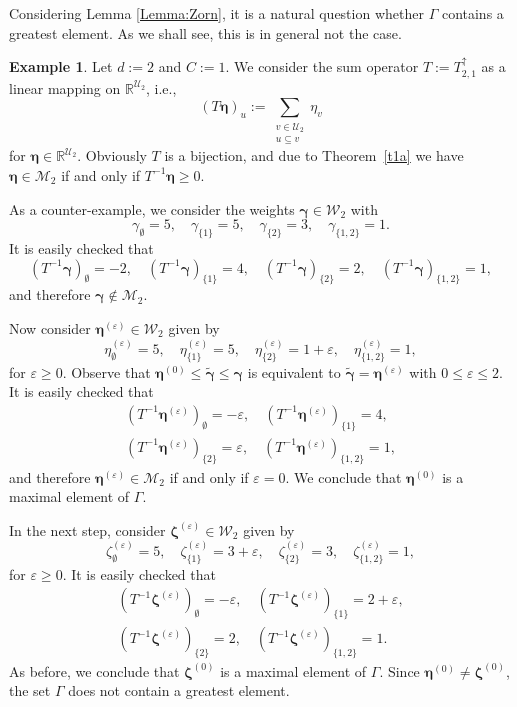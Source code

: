 \documentclass{article}
\newcommand{\R}  {{\mathbb R}}
\newcommand{\eps}{\varepsilon}
\newcommand{\bg}{{\boldsymbol{\gamma}}}
\newcommand{\be}{{\boldsymbol{\eta}}}
\newcommand{\bz}{{\boldsymbol{\zeta}}}
\newcommand{\U}  {\mathcal{U}}
\newcommand{\W}  {\mathcal{W}}
\newcommand{\M}  {\mathcal{M}}
\newcommand{\up}{\uparrow}
\theoremstyle{plain}
\theoremstyle{definition}
\newtheorem{exmp}{Example}
\begin{document}
Considering Lemma \ref{Lemma:Zorn}, it is a natural question whether 
$\Gamma$ contains a greatest element.
As we shall see, this is in general not the case. 

\begin{exmp}
Let $d := 2$ and $C := 1$. We consider the sum operator
$T:=T_{2,1}^\up$ as a linear mapping on $\R^{\U_2}$, i.e.,
\[
\left(T \be\right)_u :=
\sum_{\substack{v\in \U_2 \\ u\subseteq v}} \eta_v
\]
for $\be \in \R^{\U_2}$.
Obviously $T$ is a bijection, and due to Theorem~\ref{t1a} we
have $\be \in \M_2$ if and only if $T^{-1} \be \geq 0$.

As a counter-example,
we consider the weights $\bg \in \W_2$ with 
\[
\gamma_{\emptyset}=5,\quad 
\gamma_{\{1\}}=5,\quad \gamma_{\{2\}}=3,\quad \gamma_{\{1,2\}}=1.
\]
It is easily checked that 
\[
\left(T^{-1}\bg\right)_{\emptyset}=-2,\quad 
\left(T^{-1}\bg\right)_{\{1\}}=4,\quad 
\left(T^{-1}\bg\right)_{\{2\}}=2,\quad 
\left(T^{-1}\bg\right)_{\{1,2\}}=1,
\]
and therefore $\bg\not\in\M_2$. 

Now consider $\be^{(\eps)} \in \W_2$ given by 
\[
\eta_{\emptyset}^{(\eps)}=5,\quad \eta_{\{1\}}^{(\eps)}=5,\quad 
\eta_{\{2\}}^{(\eps)}=1+\eps,\quad \eta_{\{1,2\}}^{(\eps)}=1,
\]
for $\eps \geq 0$. Observe that
$\be^{(0)} \leq \widetilde{\bg} \leq \bg$ is equivalent to 
$\widetilde{\bg} = \be^{(\eps)}$ with $0 \leq \eps \leq 2$.
It is easily checked that 
\begin{gather*}
\left(T^{-1}\be^{(\eps)}\right)_{\emptyset}=-\eps,\quad 
\left(T^{-1}\be^{(\eps)}\right)_{\{1\}}=4,\\
\left(T^{-1}\be^{(\eps)}\right)_{\{2\}}=\eps,\quad 
\left(T^{-1}\be^{(\eps)}\right)_{\{1,2\}}=1,
\end{gather*}
and therefore $\be^{(\eps)} \in\M_2$ if and only if $\eps = 0$.
We conclude that $\be^{(0)}$ is a maximal element of $\Gamma$.

In the next step, consider 
$\bz^{(\eps)} \in \W_2$ given by 
\[
\zeta_{\emptyset}^{(\eps)}=5,\quad \zeta_{\{1\}}^{(\eps)}=3+\eps,\quad 
\zeta_{\{2\}}^{(\eps)}=3,\quad \zeta_{\{1,2\}}^{(\eps)}=1,
\]
for $\eps \geq 0$.
It is easily checked that 
\begin{gather*}
\left(T^{-1}\bz^{(\eps)}\right)_{\emptyset}=-\eps,\quad 
\left(T^{-1}\bz^{(\eps)}\right)_{\{1\}}=2+\eps,\\
\left(T^{-1}\bz^{(\eps)}\right)_{\{2\}}=2,\quad 
\left(T^{-1}\bz^{(\eps)}\right)_{\{1,2\}}=1.
\end{gather*}
As before, we conclude that $\bz^{(0)}$ is a maximal element 
of $\Gamma$. Since $\be^{(0)} \neq \bz^{(0)}$, the set $\Gamma$
does not contain a greatest element.
\end{exmp}
\end{document}
